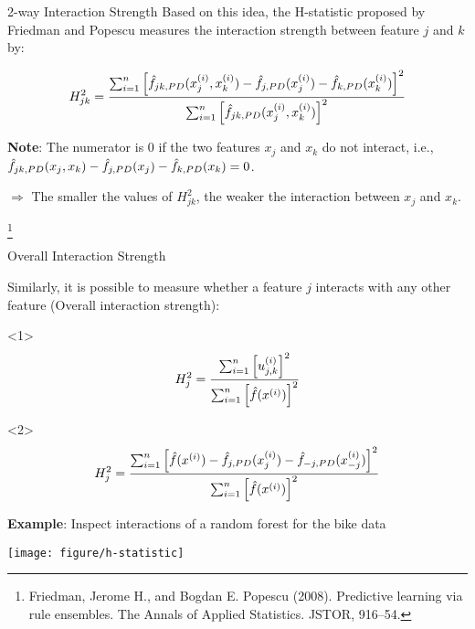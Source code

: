 \documentclass[11pt,compress,t,notes=noshow, aspectratio=169, xcolor=table]{beamer}
\begin{document}
\begin{vbframe}{2-way Interaction Strength}
Based on this idea, the H-statistic proposed by Friedman and Popescu measures the interaction strength between feature $j$ and $k$ by:

	$$H^2_{jk} = \frac{\sum_{i=1}^n\left[\hat{f}_{jk,PD}(x_j^{(i)}, x_k^{(i)}) - \hat{f}_{j, PD}(x_j^{(i)}) - \hat{f}_{k, PD}(x_k^{(i)})  \right]^2}{\sum_{i=1}^n \left[\hat{f}_{jk,PD}(x_j^{(i)}, x_k^{(i)}) \right]^2}$$

\textbf{Note}: The numerator is $0$ if the two features $x_j$ and $x_k$ do not interact, i.e., $\hat{f}_{jk, PD}(x_j, x_k) - \hat{f}_{j, PD}(x_j) - \hat{f}_{k, PD}(x_k) = 0$.

$\Rightarrow$ The smaller the values of $H^2_{jk}$, the weaker the interaction between $x_j$ and $x_k$.


\footnote[frame]{Friedman, Jerome H., and Bogdan E. Popescu (2008). Predictive learning via rule ensembles. The Annals of Applied Statistics. JSTOR, 916–54.}

\end{vbframe}


\begin{vbframe}{Overall Interaction Strength}

Similarly, it is possible to measure whether a feature $j$ interacts with any other feature (Overall interaction strength):

\begin{onlyenv}<1>
$$H^2_{j} = \frac{\sum_{i=1}^n\left[u^{(i)}_{j,k} \right]^2}{\sum_{i=1}^n \left[\hat{f}(x^{(i)}) \right]^2}$$
\end{onlyenv}
\begin{onlyenv}<2>$$H^2_{j} = \frac{\sum_{i=1}^n\left[\hat{f}(x^{(i)}) - \hat{f}_{j, PD}(x_j^{(i)}) - \hat{f}_{-j, PD}(x_{-j}^{(i)})  \right]^2}{\sum_{i=1}^n \left[\hat{f}(x^{(i)}) \right]^2}$$
\end{onlyenv}
\textbf{Example}: Inspect interactions of a random forest for the bike data

\begin{center}
	\texttt{[image: figure/h-statistic]}
\end{center}
\end{vbframe}
\end{document}
